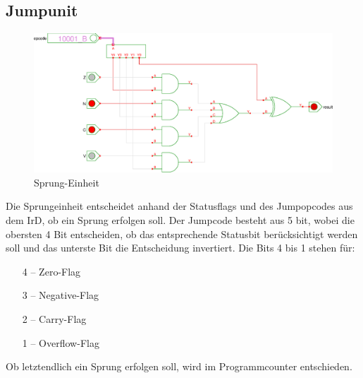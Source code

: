 \subsection{Jumpunit}
\begin{figure}[!ht]
\centering
\includegraphics[width=1\textwidth]{images/ju.eps}
\caption{\label{HW:JU}Sprung-Einheit}
\end{figure}
Die Sprungeinheit entscheidet anhand der Statusflags und des Jumpopcodes aus dem IrD, ob ein Sprung erfolgen soll. Der Jumpcode besteht aus 5 bit, wobei die obersten 4 Bit entscheiden, ob das entsprechende Statusbit berücksichtigt werden soll und das unterste Bit die Entscheidung invertiert. Die Bits 4 bis 1 stehen für:
\begin{enumerate}
 \item[4] -- Zero-Flag
 \item[3] -- Negative-Flag
 \item[2] -- Carry-Flag
 \item[1] -- Overflow-Flag
\end{enumerate}
Ob letztendlich ein Sprung erfolgen soll, wird im Programmcounter entschieden.
